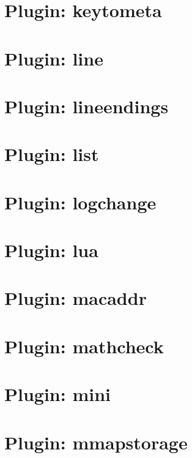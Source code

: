 \let\mypdfximage\pdfximage\def\pdfximage{\immediate\mypdfximage}\documentclass[twoside]{book}
\newcommand{\+}{\discretionary{\mbox{\scriptsize$\hookleftarrow$}}{}{}}
\begin{document}
\chapter{Plugin\+: keytometa}
\label{autotoc_md364}

\chapter{Plugin\+: line}
\label{autotoc_md372}

\chapter{Plugin\+: lineendings}
\label{autotoc_md382}

\chapter{Plugin\+: list}
\label{autotoc_md384}

\chapter{Plugin\+: logchange}
\label{autotoc_md388}

\chapter{Plugin\+: lua}
\label{autotoc_md390}

\chapter{Plugin\+: macaddr}
\label{autotoc_md395}

\chapter{Plugin\+: mathcheck}
\label{autotoc_md399}

\chapter{Plugin\+: mini}
\label{autotoc_md402}

\chapter{Plugin\+: mmapstorage}
\label{autotoc_md429}

\end{document}
